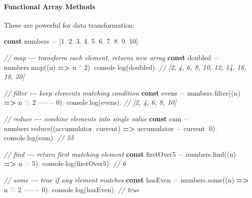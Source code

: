 \documentclass[
  justified,
  openright,
]{tufte-book}
\let\subsection\paragraph
\let\paragraph\paragraph
\newcommand{\KeywordTok}[1]{\textcolor{CodeKeyword}{\textbf{#1}}}  %
\newcommand{\CommentTok}[1]{\textcolor{CodeComment}{\textit{#1}}}  %
\newcommand{\CodeNumTok}[1]{\textcolor{CodeNumber}{#1}}             %
\newcommand{\CodeFuncTok}[1]{\textcolor{CodeKeyword}{#1}}           %
\newcommand{\OperatorTok}[1]{\textcolor{DarkGray}{#1}}              %
\newenvironment{Shaded}{%
  \begin{mdframed}[style=TufteCode]%
}{%
  \end{mdframed}%
}
\let\subsection\paragraph
\let\paragraph\paragraph
\begin{document}
\subsection{Functional Array Methods}\label{functional-array-methods}

These are powerful for data transformation:

\begin{Shaded}
\begin{Highlighting}[]
\KeywordTok{const} numbers \OperatorTok{=} [\CodeNumTok{1}\OperatorTok{,} \CodeNumTok{2}\OperatorTok{,} \CodeNumTok{3}\OperatorTok{,} \CodeNumTok{4}\OperatorTok{,} \CodeNumTok{5}\OperatorTok{,} \CodeNumTok{6}\OperatorTok{,} \CodeNumTok{7}\OperatorTok{,} \CodeNumTok{8}\OperatorTok{,} \CodeNumTok{9}\OperatorTok{,} \CodeNumTok{10}]\OperatorTok{;}
 
\CommentTok{// map {-}{-}{-} transform each element, returns new array}
\KeywordTok{const} doubled \OperatorTok{=} numbers\OperatorTok{.}\CodeFuncTok{map}((n) \KeywordTok{=\textgreater{}} n \OperatorTok{*} \CodeNumTok{2})\OperatorTok{;}
console\OperatorTok{.}\CodeFuncTok{log}(doubled)\OperatorTok{;} \CommentTok{// [2, 4, 6, 8, 10, 12, 14, 16, 18, 20]}
 
\CommentTok{// filter {-}{-}{-} keep elements matching condition}
\KeywordTok{const} evens \OperatorTok{=} numbers\OperatorTok{.}\CodeFuncTok{filter}((n) \KeywordTok{=\textgreater{}} n \OperatorTok{\%} \CodeNumTok{2} \OperatorTok{===} \CodeNumTok{0})\OperatorTok{;}
console\OperatorTok{.}\CodeFuncTok{log}(evens)\OperatorTok{;} \CommentTok{// [2, 4, 6, 8, 10]}
 
\CommentTok{// reduce {-}{-}{-} combine elements into single value}
\KeywordTok{const} sum \OperatorTok{=} numbers\OperatorTok{.}\CodeFuncTok{reduce}((accumulator\OperatorTok{,} current) \KeywordTok{=\textgreater{}} accumulator \OperatorTok{+} current\OperatorTok{,} \CodeNumTok{0})\OperatorTok{;}
console\OperatorTok{.}\CodeFuncTok{log}(sum)\OperatorTok{;} \CommentTok{// 55}
 
\CommentTok{// find {-}{-}{-} return first matching element}
\KeywordTok{const} firstOver5 \OperatorTok{=} numbers\OperatorTok{.}\CodeFuncTok{find}((n) \KeywordTok{=\textgreater{}} n \OperatorTok{\textgreater{}} \CodeNumTok{5})\OperatorTok{;}
console\OperatorTok{.}\CodeFuncTok{log}(firstOver5)\OperatorTok{;} \CommentTok{// 6}
 
\CommentTok{// some {-}{-}{-} true if any element matches}
\KeywordTok{const} hasEven \OperatorTok{=} numbers\OperatorTok{.}\CodeFuncTok{some}((n) \KeywordTok{=\textgreater{}} n \OperatorTok{\%} \CodeNumTok{2} \OperatorTok{===} \CodeNumTok{0})\OperatorTok{;}
console\OperatorTok{.}\CodeFuncTok{log}(hasEven)\OperatorTok{;} \CommentTok{// true}
 

\end{Highlighting}
\end{Shaded}
\end{document}
